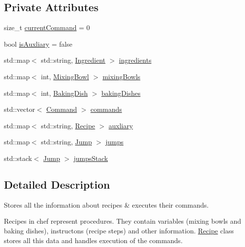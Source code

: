 \subsection*{Private Attributes}
\begin{DoxyCompactItemize}
\item 
size\-\_\-t \hyperlink{classRecipe_ab29f1a07d6c30a5c7b4da4ab53822c49}{current\-Command} = 0
\item 
bool \hyperlink{classRecipe_a3edfc934ad30f52f01dc90630b0decaa}{is\-Auxliary} = false
\item 
std\-::map$<$ std\-::string, \hyperlink{classIngredient}{Ingredient} $>$ \hyperlink{classRecipe_a5fa367694eb22ad1aa480feda0df8444}{ingredients}
\item 
std\-::map$<$ int, \hyperlink{classDish}{Mixing\-Bowl} $>$ \hyperlink{classRecipe_aab5e3eecd432df72ba75c4da724e27f0}{mixing\-Bowls}
\item 
std\-::map$<$ int, \hyperlink{classDish}{Baking\-Dish} $>$ \hyperlink{classRecipe_a0656141f4c08c927d7e5ca33f7250775}{baking\-Dishes}
\item 
std\-::vector$<$ \hyperlink{structCommand}{Command} $>$ \hyperlink{classRecipe_a4064c07492776e65ff332027576174f1}{commands}
\item 
std\-::map$<$ std\-::string, \hyperlink{classRecipe}{Recipe} $>$ \hyperlink{classRecipe_a6d8db46e663ea4792424742098e35e99}{auxliary}
\item 
std\-::map$<$ std\-::string, \hyperlink{structJump}{Jump} $>$ \hyperlink{classRecipe_a1e3f8326650076f4b111c36a945ba39c}{jumps}
\item 
std\-::stack$<$ \hyperlink{structJump}{Jump} $>$ \hyperlink{classRecipe_ac77f2bfae96f952d40ab79163d94c659}{jumps\-Stack}
\end{DoxyCompactItemize}


\subsection{Detailed Description}
Stores all the information about recipes \& executes their commands. 

Recipes in chef represent procedures. They contain variables (mixing bowls and baking dishes), instructons (recipe steps) and other information. \hyperlink{classRecipe}{Recipe} class stores all this data and handles execution of the commands. 

